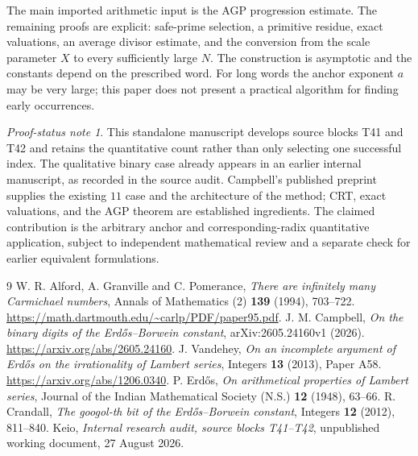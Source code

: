 \documentclass[11pt,a4paper]{article}
\theoremstyle{definition}\newtheorem{definition}[theorem]{Definition}
\theoremstyle{remark}\newtheorem{remark}[theorem]{Remark}
\newtheorem{audit}[theorem]{Proof-status note}
\begin{document}
The main imported arithmetic input is the AGP progression estimate. The remaining proofs are explicit: safe-prime selection, a primitive residue, exact valuations, an average divisor estimate, and the conversion from the scale parameter $X$ to every sufficiently large $N$. The construction is asymptotic and the constants depend on the prescribed word. For long words the anchor exponent $a$ may be very large; this paper does not present a practical algorithm for finding early occurrences.

\begin{audit}
This standalone manuscript develops source blocks T41 and T42 and retains the quantitative count rather than only selecting one successful index. The qualitative binary case already appears in an earlier internal manuscript, as recorded in the source audit. Campbell's published preprint supplies the existing $11$ case and the architecture of the method; CRT, exact valuations, and the AGP theorem are established ingredients. The claimed contribution is the arbitrary anchor and corresponding-radix quantitative application, subject to independent mathematical review and a separate check for earlier equivalent formulations.
\end{audit}

\begin{thebibliography}{9}
W. R. Alford, A. Granville and C. Pomerance,
\emph{There are infinitely many Carmichael numbers},
Annals of Mathematics (2) \textbf{139} (1994), 703--722.
\url{https://math.dartmouth.edu/~carlp/PDF/paper95.pdf}.
J. M. Campbell,
\emph{On the binary digits of the Erd\H{o}s--Borwein constant},
arXiv:2605.24160v1 (2026).
\url{https://arxiv.org/abs/2605.24160}.
J. Vandehey,
\emph{On an incomplete argument of Erd\H{o}s on the irrationality of Lambert series},
Integers \textbf{13} (2013), Paper A58.
\url{https://arxiv.org/abs/1206.0340}.
P. Erd\H{o}s,
\emph{On arithmetical properties of Lambert series},
Journal of the Indian Mathematical Society (N.S.) \textbf{12} (1948), 63--66.
R. Crandall,
\emph{The googol-th bit of the Erd\H{o}s--Borwein constant},
Integers \textbf{12} (2012), 811--840.
Keio, \emph{Internal research audit, source blocks T41--T42},
unpublished working document, 27 August 2026.
\end{thebibliography}
\end{document}
